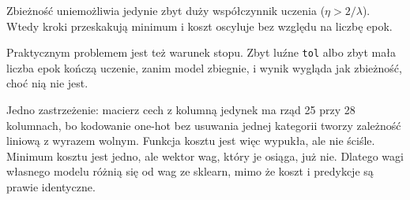 \documentclass[11pt,a4paper]{article}
\begin{document}
Zbieżność uniemożliwia jedynie zbyt duży współczynnik uczenia ($\eta > 2/\lambda$). Wtedy
kroki przeskakują minimum i koszt oscyluje bez względu na liczbę epok.

Praktycznym problemem jest też warunek stopu. Zbyt luźne \texttt{tol} albo zbyt mała liczba
epok kończą uczenie, zanim model zbiegnie, i wynik wygląda jak zbieżność, choć nią nie jest.

Jedno zastrzeżenie: macierz cech z kolumną jedynek ma rząd 25 przy 28 kolumnach, bo kodowanie
one-hot bez usuwania jednej kategorii tworzy zależność liniową z wyrazem wolnym. Funkcja kosztu
jest więc wypukła, ale nie ściśle. Minimum kosztu jest jedno, ale wektor wag, który je osiąga,
już nie. Dlatego wagi własnego modelu różnią się od wag ze sklearn, mimo że koszt i predykcje są
prawie identyczne.
\end{document}

